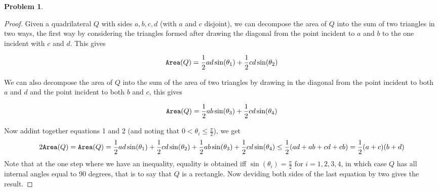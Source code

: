 \documentclass{article}
\newcommand{\A}{{\tt Area}}
\newtheorem{prb}{Problem}
\begin{document}
	   \begin{prb}  \end{prb} 
	   \begin{proof} 
	         Given a quadrilateral $Q$ with sides $a, b, c, d$ (with $a$ and $c$ disjoint), 
		 we can decompose the area of $Q$ into the sum of two triangles in two ways, the first 
		 way by considering the triangles formed after drawing the diagonal from 
		 the point incident to $a$ and $b$ to the one incident with $c$ and $d$. This gives 
		
		 \begin{equation} 
			 \A(Q) = \frac{1}{2}ad \sin(\theta_1) + \frac{1}{2} cd \sin(\theta_2) 
	         \end{equation}

		 We can also decompose the area of $Q$ into the sum of the area of two triangles 
		 by drawing in the diagonal from the point incident to both $a$ and $d$ and the 
		 point incident to both $b$ and $c$, this gives 

		 \begin{equation}
		 	\A(Q) = \frac{1}{2}ab \sin(\theta_3) +\frac{1}{2} cd \sin(\theta_4) 
		 \end{equation}
		
		 Now addint together equations 1 and 2  (and noting that $ 0< \theta_i \leq \frac{\pi}{2}$), we get 
		 \begin{equation}
		 	2\A(Q) = \A(Q) = \frac{1}{2}ad \sin(\theta_1) + \frac{1}{2}cd \sin(\theta_2) +  \frac{1}{2}ab \sin(\theta_3) + \frac{1}{2}cd \sin(\theta_4) \leq \frac{1}{2}(ad + ab + cd + cb) = \frac{1}{2}(a + c)(b+ d) 
		 \end{equation}
	   Note that at the one step where we have an inequality, equality is obtained iff $\sin(\theta_i) = \frac{\pi}{2}$ for $i = 1,2,3,4$, in which case $Q$ has all internal angles equal to 90 degrees, that is to say that $Q$ is 
	   a rectangle. Now 
	   deviding both sides of the last equation by two gives the result. 

	   \end{proof} 
\end{document}
